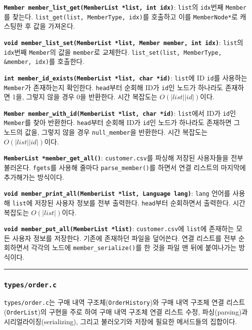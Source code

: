 \documentclass[runningheads]{llncs}
\begin{document}
\textbf{\texttt{Member member_list_get(MemberList *list, int idx)}}: \texttt{list}의 \texttt{idx}번째 \texttt{Member}를 찾는다. \texttt{list_get(list, MemberType, idx)}를 호출하고 이를 \texttt{MemberNode*}로 캐스팅한 후 값을 가져온다.

\textbf{\texttt{void member_list_set(MemberList *list, Member member, int idx)}}: \texttt{list}의 \texttt{idx}번째 \texttt{Member}의 값을 \texttt{member}로 교체한다. \texttt{list_set(list, MemberType, \&member, idx)}를 호출한다.

\textbf{\texttt{int member_id_exists(MemberList *list, char *id)}}: \texttt{list}에 ID \texttt{id}를 사용하는 \texttt{Member}가 존재하는지 확인한다. \texttt{head}부터 순회해 ID가 \texttt{id}인 노드가 하나라도 존재하면 1을, 그렇지 않을 경우 0을 반환한다. 시간 복잡도는 $O(\left|list\right|\left|id\right|)$이다.

\textbf{\texttt{Member member_with_id(MemberList *list, char *id)}}: \texttt{list}에서 ID가 \texttt{id}인 \texttt{Member}를 찾아 반환한다. \texttt{head}부터 순회해 ID가 \texttt{id}인 노드가 하나라도 존재하면 그 노드의 값을, 그렇지 않을 경우 \texttt{null_member}을 반환한다. 시간 복잡도는 $O(\left|list\right|\left|id\right|)$이다.

\textbf{\texttt{MemberList *member_get_all()}}: \texttt{customer.csv}를 파싱해 저장된 사용자들을 전부 불러온다. \texttt{fgets}를 사용해 줄마다 \texttt{parse_member()}를 하면서 연결 리스트의 마지막에 추가해가는 방식이다.

\textbf{\texttt{void member_print_all(MemberList *list, Language lang)}}: \texttt{lang} 언어를 사용해 \texttt{list}에 저장된 사용자 정보를 전부 출력한다. \texttt{head}부터 순회하면서 출력한다. 시간 복잡도는 $O(\left|list\right|)$이다.

\textbf{\texttt{void member_put_all(MemberList *list)}}: \texttt{customer.csv}에 \texttt{list}에 존재하는 모든 사용자 정보를 저장한다. 기존에 존재하던 파일을 덮어쓴다. 연결 리스트를 전부 순회하면서 각각의 노드에 \texttt{member_serialize()}를 한 것을 파일 맨 뒤에 붙여나가는 방식이다.

\noindent\rule{2cm}{0.4pt}

\subsubsection{\texttt{types/order.c}}
\texttt{types/order.c}는 구매 내역 구조체(\texttt{OrderHistory})와 구매 내역 구조체 연결 리스트(\texttt{OrderList})의 구현을 주로 하여 구매 내역 구조체 연결 리스트 수정, 파싱(parsing)과 시리얼라이징(serializing), 그리고 불러오기와 저장에 필요한 메서드들의 집합이다.
\end{document}
